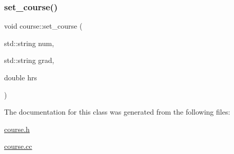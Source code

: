 \hypertarget{classcourse_a1fce1a16efb3f07d0da5daca8005e4a6}{}\label{classcourse_a1fce1a16efb3f07d0da5daca8005e4a6} 
\subsubsection{\texorpdfstring{set\+\_\+course()}{set\_course()}}
{\footnotesize\ttfamily void course\+::set\+\_\+course (\begin{DoxyParamCaption}\item[{std\+::string}]{num,  }\item[{std\+::string}]{grad,  }\item[{double}]{hrs }\end{DoxyParamCaption})}



The documentation for this class was generated from the following files\+:\begin{DoxyCompactItemize}
\item 
\hyperlink{course_8h}{course.\+h}\item 
\hyperlink{course_8cc}{course.\+cc}\end{DoxyCompactItemize}
